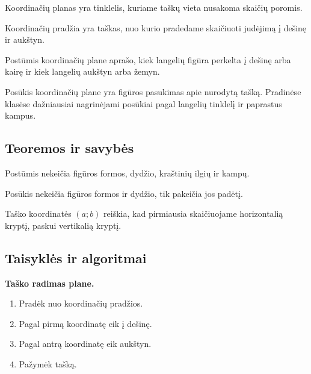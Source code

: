 \begin{apibreztis}
Koordinačių planas yra tinklelis, kuriame taškų vieta nusakoma skaičių poromis.
\end{apibreztis}

\begin{apibreztis}
Koordinačių pradžia yra taškas, nuo kurio pradedame skaičiuoti judėjimą į dešinę ir aukštyn.
\end{apibreztis}

\begin{apibreztis}
Postūmis koordinačių plane aprašo, kiek langelių figūra perkelta į dešinę arba kairę ir kiek langelių aukštyn arba žemyn.
\end{apibreztis}

\begin{apibreztis}
Posūkis koordinačių plane yra figūros pasukimas apie nurodytą tašką. Pradinėse klasėse dažniausiai nagrinėjami posūkiai pagal langelių tinklelį ir paprastus kampus.
\end{apibreztis}

\subsection{Teoremos ir savybės}

\begin{savybe}
Postūmis nekeičia figūros formos, dydžio, kraštinių ilgių ir kampų.
\end{savybe}

\begin{savybe}
Posūkis nekeičia figūros formos ir dydžio, tik pakeičia jos padėtį.
\end{savybe}

\begin{savybe}
Taško koordinatės \((a;b)\) reiškia, kad pirmiausia skaičiuojame horizontalią kryptį, paskui vertikalią kryptį.
\end{savybe}

\subsection{Taisyklės ir algoritmai}

\textbf{Taško radimas plane.}
\begin{enumerate}[label=\arabic*.]
\item Pradėk nuo koordinačių pradžios.
\item Pagal pirmą koordinatę eik į dešinę.
\item Pagal antrą koordinatę eik aukštyn.
\item Pažymėk tašką.
\end{enumerate}

